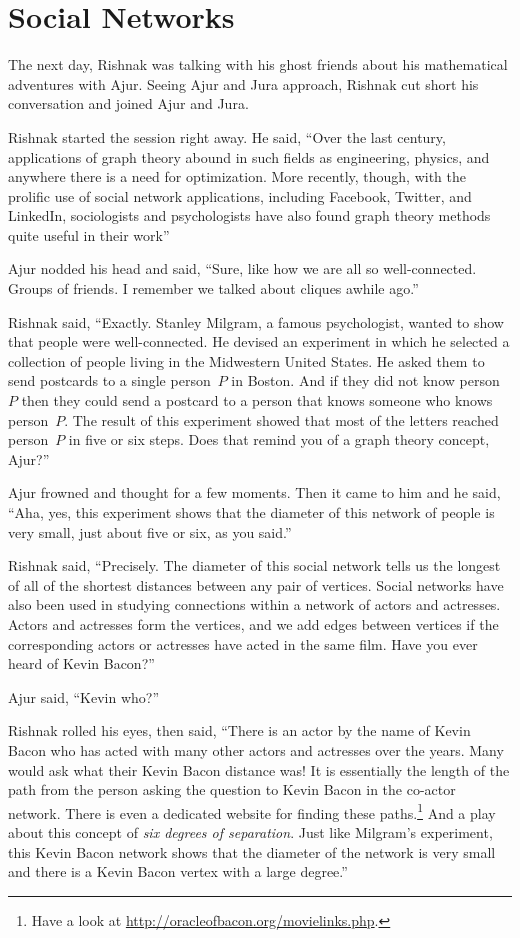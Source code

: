 \chapter{Social Networks}

The next day, Rishnak was talking with his ghost friends about his mathematical adventures with Ajur. Seeing Ajur and Jura approach, Rishnak cut short his conversation and joined Ajur and Jura.

Rishnak started the session right away. He said, ``Over the last century, applications of graph theory abound in such fields as engineering, physics, and anywhere there is a need for optimization. More recently, though, with the prolific use of social network applications, including Facebook, Twitter, and LinkedIn, sociologists and psychologists have also found graph theory methods quite useful in their work''

Ajur nodded his head and said, ``Sure, like how we are all so well-connected.  Groups of friends. I remember we talked about cliques awhile ago.''

Rishnak said, ``Exactly. Stanley Milgram, a famous psychologist, wanted to show that people were well-connected. He devised an experiment in which he selected a collection of people living in the Midwestern United States. He asked them to send postcards to a single person~$P$ in Boston. And if they did not know person~$P$ then they could send a postcard to a person that knows someone who knows person~$P$. The result of this experiment showed that most of the letters reached person~$P$ in five or six steps. Does that remind you of a graph theory concept, Ajur?''

Ajur frowned and thought for a few moments. Then it came to him and he said, ``Aha, yes, this experiment shows that the diameter of this network of people is very small, just about five or six, as you said.''

Rishnak said, ``Precisely. The diameter of this social network tells us the longest of all of the shortest distances between any pair of vertices. Social networks have also been used in studying connections within a network of actors and actresses. Actors and actresses form the vertices, and we add edges between vertices if the corresponding actors or actresses have acted in the same film. Have you ever heard of Kevin Bacon?''

Ajur said, ``Kevin who?''

Rishnak rolled his eyes, then said, ``There is an actor by the name of Kevin Bacon who has acted with many other actors and actresses over the years. Many would ask what their Kevin Bacon distance was! It is essentially the length of the path from the person asking the question to Kevin Bacon in the co-actor network. There is even a dedicated website for finding these paths.\footnote{Have a look at \url{http://oracleofbacon.org/movielinks.php}.} And a play about this concept of \textit{six degrees of separation}. Just like Milgram's experiment, this Kevin Bacon network shows that the diameter of the network is very small and there is a Kevin Bacon vertex with a large degree.''

